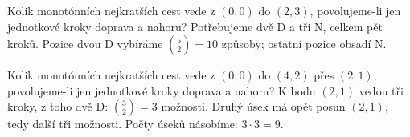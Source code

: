 \documentclass[11pt,a4paper]{article}
\begin{document}
\begin{zadaniReseniBox}[title={Úloha C4}]
Kolik monotónních nejkratších cest vede z $(0,0)$ do $(2,3)$, povolujeme-li jen jednotkové kroky doprava a nahoru?
\tcblower
Potřebujeme dvě D a tři N, celkem pět kroků. Pozice dvou D vybíráme $\binom52=10$ způsoby; ostatní pozice obsadí N.
\end{zadaniReseniBox}

\begin{zadaniReseniBox}[title={Úloha C5}]
Kolik monotónních nejkratších cest vede z $(0,0)$ do $(4,2)$ přes $(2,1)$, povolujeme-li jen jednotkové kroky doprava a nahoru?
\tcblower
K bodu $(2,1)$ vedou tři kroky, z toho dvě D: $\binom32=3$ možnosti. Druhý úsek má opět posun $(2,1)$, tedy další tři možnosti. Počty úseků násobíme: $3\cdot3=9$.
\end{zadaniReseniBox}


\end{document}
